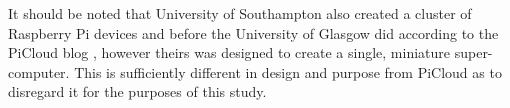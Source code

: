 \label{intro:pisupercomp}

It should be noted that University of Southampton also created a cluster of Raspberry Pi devices and before the University of Glasgow did according to the PiCloud blog \citep{picloudonsouthampton}, however theirs was designed to create a single, miniature super-computer.
This is sufficiently different in design and purpose from PiCloud as to disregard it for the purposes of this study.